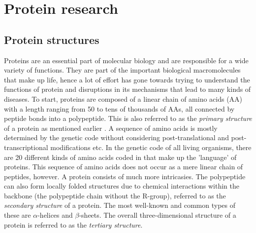 \section{Protein research}
\subsection{Protein structures}
Proteins are an essential part of molecular biology and are responsible for a wide variety of functions. They are part of the important biological macromolecules that make up life, hence a lot of effort has gone towards trying to understand the functions of protein and disruptions in its mechanisms that lead to many kinds of diseases. To start, proteins are composed of a linear chain of amino acids (AA) with a length ranging from 50 to tens of thousands of AAs, all connected by peptide bonds into a polypeptide. This is also referred to as the \textit{primary structure} of a protein as mentioned earlier \cite{primstruct}. A sequence of amino acids is mostly determined by the genetic code without considering post-translational and post-transcriptional modifications etc. In the genetic code of all living organisms, there are 20 different kinds of amino acids coded in that make up the 'language' of proteins. This sequence of amino acids does not occur as a mere linear chain of peptides, however. A protein consists of much more intricasies. The polypeptide can also form locally folded structures due to chemical interactions within the backbone (the polypeptide chain without the R-group), referred to as the \textit{secondary structure} of a protein. The most well-known and common types of these are $\alpha$-helices and $\beta$-sheets. The overall three-dimensional structure of a protein is referred to as the \textit{tertiary structure}.

